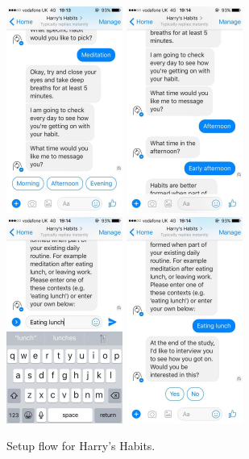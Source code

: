 \begin{figure}[H]
  \newline
  \newline
  \includegraphics[width=1.5in]{resources/design/process/9.jpg}
  \hspace{10px}
  \includegraphics[width=1.5in]{resources/design/process/10.jpg}
  \hspace{10px}
  \includegraphics[width=1.5in]{resources/design/process/11.jpg}
  \hspace{10px}
  \includegraphics[width=1.5in]{resources/design/process/12.jpg}
  \caption{Setup flow for Harry's Habits.}
  \label{fig:setup_flow_screenshots}
\end{figure}

